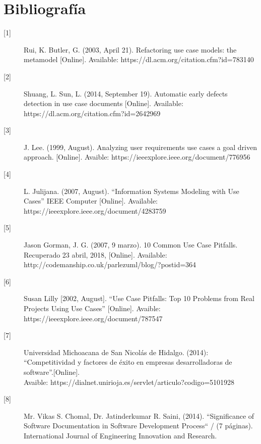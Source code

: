 \chapter{Bibliografía}

\begin{description}
	
		\item[\hypertarget{b01}{[1]}] Rui, K. Butler, G. (2003, April 21). Refactoring use case models: the metamodel [Online]. Available: https://dl.acm.org/citation.cfm?id=783140
		
		\item[\hypertarget{b02}{[2]}] Shuang, L. Sun, L. (2014, September 19). Automatic early defects detection in use case documents [Online]. Available: https://dl.acm.org/citation.cfm?id=2642969
		
		\item[\hypertarget{b03}{[3]}] 
		J. Lee. (1999, August). Analyzing user requirements use cases a goal driven approach. [Online]. Avaible: https://ieeexplore.ieee.org/document/776956
		
		\item[\hypertarget{b04}{[4]}]  L. Julijana. (2007, August). “Information Systems Modeling with Use Cases” IEEE Computer [Online]. Available:
		https://ieeexplore.ieee.org/document/4283759
		
		\item[\hypertarget{b05}{[5]}] Jason Gorman, J. G. (2007, 9 marzo). 10 Common Use Case Pitfalls. Recuperado 23 abril, 2018,  [Online]. Available: http://codemanship.co.uk/parlezuml/blog/?postid=364
		
		\item[\hypertarget{b06}{[6]}] Susan Lilly [2002, August]. “Use Case Pitfalls: Top 10 Problems from Real Projects Using Use Cases” [Online]. Avaible: https://ieeexplore.ieee.org/document/787547
		
		\item[\hypertarget{b07}{[7]}] Universidad Michoacana de San Nicolás de Hidalgo. (2014): “Competitividad y factores de éxito en empresas desarrolladoras de software”.[Online]. \\ Avaible: https://dialnet.unirioja.es/servlet/articulo?codigo=5101928
		
		\item[\hypertarget{b08}{[8]}] Mr. Vikas S. Chomal, Dr. Jatinderkumar R. Saini, (2014). “Significance of Software Documentation in Software
		Development Process“
 / (7 páginas). International Journal of Engineering Innovation and Research. 
 

\end{description}
